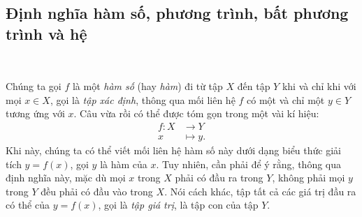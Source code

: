 \subsection{Định nghĩa hàm số, phương trình, bất phương trình và hệ}

\ %

Chúng ta gọi $f$ là một \emph{hàm số} (hay \emph{hàm}) đi từ tập $X$ đến tập $Y$ khi và chỉ khi với mọi $x\in X$, gọi là \emph{tập xác định}, thông qua mối liên hệ $f$ có một và chỉ một $y\in Y$ tương ứng với $x$. Câu vừa rồi có thể được tóm gọn trong một vài kí hiệu: \begin{align*}f: X &\to Y \\ x &\mapsto y.\end{align*} Khi này, chúng ta có thể viết mối liên hệ hàm số này dưới dạng biểu thức giải tích $y=f(x)$, gọi $y$ là hàm của $x$. Tuy nhiên, cần phải để ý rằng, thông qua định nghĩa này, mặc dù mọi $x$ trong $X$ phải có đầu ra trong $Y$, không phải mọi $y$ trong $Y$ đều phải có đầu vào trong $X$. Nói cách khác, tập tất cả các giá trị đầu ra có thể của $y=f(x)$, gọi là \emph{tập giá trị}, là tập con của tập $Y$.

